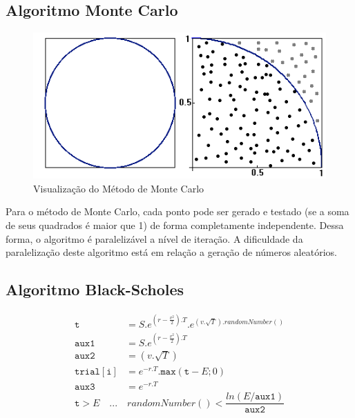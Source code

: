 \documentclass[12pt]{article}
\begin{document}
\subsection{Algoritmo Monte Carlo}

\begin{figure}[h]
	\centering
	\includegraphics[width=.8\textwidth]{fig02.png}
	\caption{Visualização do Método de Monte Carlo}
	\label{fig:MonteCarloFig01}
\end{figure}
	
Para o método de Monte Carlo, cada ponto pode ser gerado e testado (se a soma de seus quadrados
é maior que 1) de forma completamente independente. Dessa forma, o algoritmo é paralelizável
a nível de iteração. A dificuldade da paralelização deste algoritmo está em relação a geração
de números aleatórios. \\

\subsection{Algoritmo Black-Scholes}

\begin{equation}
	\begin{aligned}
		\mathtt{t}			&= S.e^{(r-\frac{v^2}{2}).T}.e^{(v.\sqrt{T}).randomNumber()}\\
		\mathtt{aux1}		&= S.e^{(r-\frac{v^2}{2}).T}\\
		\mathtt{aux2}		&= (v.\sqrt{T})\\
		\mathtt{trial[i]}	&= e^{-r.T}.\mathtt{max}(\mathtt{t}-E;0)\\
		\mathtt{aux3}		&= e^{-r.T}
	\end{aligned}
\end{equation}
\begin{equation}
	\mathtt{t}>E \quad ... \quad randomNumber() < \frac{ln(E/\mathtt{aux1})}{\mathtt{aux2}}
	\label{sec:validityCondition}
\end{equation}
\end{document}
